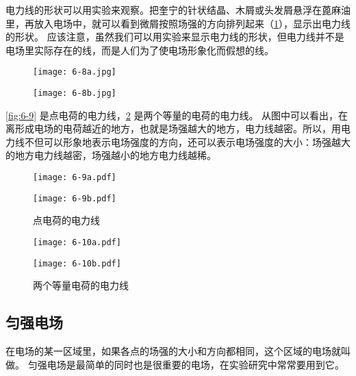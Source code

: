 电力线的形状可以用实验来观察。把奎宁的针状结晶、木屑或头发屑悬浮在蓖麻油里，再放入电场中，就可以看到微屑按照场强的方向排列起来（\cref{fig:6-8}），显示出电力线的形状。
应该注意，虽然我们可以用实验来显示电力线的形状，但电力线并不是电场里实际存在的线，而是人们为了使电场形象化而假想的线。
\begin{figure}
	\begin{minipage}{0.48\linewidth}\centering
		\texttt{[image: 6-8a.jpg]}
		\label{fig:6-8a}
	\end{minipage}
	\begin{minipage}{0.48\linewidth}\centering
		\texttt{[image: 6-8b.jpg]}
		\label{fig:6-8b}
	\end{minipage}
	\caption{}\label{fig:6-8}
\end{figure}

\cref{fig:6-9} 是点电荷的电力线，\cref{fig:6-10} 是两个等量的电荷的电力线。
从图中可以看出，在离形成电场的电荷越近的地方，也就是场强越大的地方，电力线越密。所以，用电力线不但可以形象地表示电场强度的方向，还可以表示电场强度的大小：场强越大的地方电力线越密，场强越小的地方电力线越稀。

\begin{figure}
	\begin{minipage}[b]{0.48\linewidth}\centering
		\texttt{[image: 6-9a.pdf]}
		\label{fig:6-9a}
	\end{minipage}
	\begin{minipage}[b]{0.48\linewidth}\centering
		\texttt{[image: 6-9b.pdf]}
		\label{fig:6-9b}
	\end{minipage}
	\caption{点电荷的电力线}\label{fig:6-9}
	\begin{minipage}[b]{0.48\linewidth}\centering
		\texttt{[image: 6-10a.pdf]}
		\label{fig:6-10a}
	\end{minipage}
	\begin{minipage}[b]{0.48\linewidth}\centering
		\texttt{[image: 6-10b.pdf]}
		\label{fig:6-10b}
	\end{minipage}
	\caption{两个等量电荷的电力线}\label{fig:6-10}
\end{figure}

\subsection{匀强电场} 

在电场的某一区域里，如果各点的场强的大小和方向都相同，这个区域的电场就叫做。
匀强电场是最简单的同时也是很重要的电场，在实验研究中常常要用到它。

